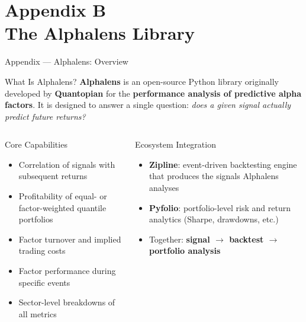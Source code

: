 \documentclass[aspectratio=169, 11pt]{beamer}
\begin{document}
\section{Appendix B\\ The Alphalens Library}
%
\begin{frame}{Appendix --- Alphalens: Overview}

\begin{block}{What Is Alphalens?}
\textbf{Alphalens} is an open-source Python library originally developed by \textbf{Quantopian} for the \textbf{performance analysis of predictive alpha factors}. It is designed to answer a single question: \emph{does a given signal actually predict future returns?}
\end{block}
\vspace{-.5cm}
\begin{columns}[T]
\begin{block}{Core Capabilities}
\begin{itemize}
  \item Correlation of signals with subsequent returns
  \item Profitability of equal- or factor-weighted quantile portfolios
  \item Factor turnover and implied trading costs
  \item Factor performance during specific events
  \item Sector-level breakdowns of all metrics
\end{itemize}
\end{block}

\begin{block}{Ecosystem Integration}
\begin{itemize}
  \item \textbf{Zipline}: event-driven backtesting engine that produces the signals Alphalens analyses
  \item \textbf{Pyfolio}: portfolio-level risk and return analytics (Sharpe, drawdowns, etc.)
  \item Together: \textbf{signal $\rightarrow$ backtest $\rightarrow$ portfolio analysis}
\end{itemize}
\end{block}
\end{columns}

\end{frame}
%
\end{document}
